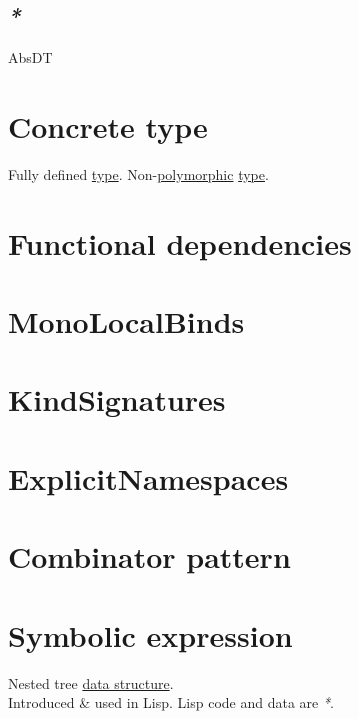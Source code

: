 \documentclass[a4paper,14pt,oneside]{book}
\begin{document}
\section{\emph{*}}
\label{sec:org6848d28}

\label{org1ac2c46}AbsDT\\

\chapter{\label{org85e31ac}Concrete type}
\label{sec:org2c6f9b7}
Fully defined \hyperref[orgdbcea73]{type}. Non-\hyperref[orgd6e543b]{polymorphic} \hyperref[orgdbcea73]{type}.\\

\chapter{\label{org29dc972}Functional dependencies}
\label{sec:orge06ca71}

\chapter{\label{orga5fb338}MonoLocalBinds}
\label{sec:orgd4febb7}

\chapter{\label{orgbc56ae8}KindSignatures}
\label{sec:orgcb555b4}

\chapter{\label{orgd60fae9}ExplicitNamespaces}
\label{sec:orgd46414b}

\chapter{\label{org4548788}Combinator pattern}
\label{sec:org758e544}

\chapter{\label{orgdb324b6}Symbolic expression}
\label{sec:orga3d6e2b}
Nested tree \hyperref[org57d6a15]{data structure}.\\

Introduced \& used in Lisp. Lisp code and data are \emph{*}.\\
\end{document}
